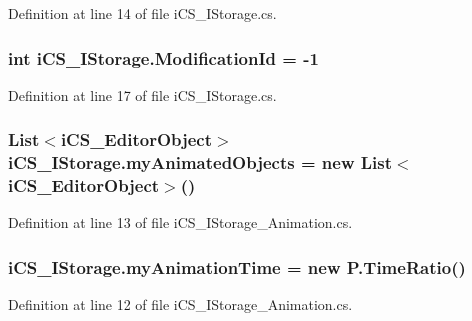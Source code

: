 Definition at line 14 of file i\+C\+S\+\_\+\+I\+Storage.\+cs.

\hypertarget{classi_c_s___i_storage_a0d048a5de0183c183b636c0bb5c8dddf}{
\subsubsection[{Modification\+Id}]{\setlength{\rightskip}{0pt plus 5cm}int i\+C\+S\+\_\+\+I\+Storage.\+Modification\+Id = -\/1}}\label{classi_c_s___i_storage_a0d048a5de0183c183b636c0bb5c8dddf}


Definition at line 17 of file i\+C\+S\+\_\+\+I\+Storage.\+cs.

\hypertarget{classi_c_s___i_storage_a1e7f74c1d51883bfc451ac154a7e468c}{
\subsubsection[{my\+Animated\+Objects}]{\setlength{\rightskip}{0pt plus 5cm}List$<${\bf i\+C\+S\+\_\+\+Editor\+Object}$>$ i\+C\+S\+\_\+\+I\+Storage.\+my\+Animated\+Objects = new List$<${\bf i\+C\+S\+\_\+\+Editor\+Object}$>$()}}\label{classi_c_s___i_storage_a1e7f74c1d51883bfc451ac154a7e468c}


Definition at line 13 of file i\+C\+S\+\_\+\+I\+Storage\+\_\+\+Animation.\+cs.

\hypertarget{classi_c_s___i_storage_a0c36a19bc9bbd91e7ed2d65c93546428}{
\subsubsection[{my\+Animation\+Time}]{ i\+C\+S\+\_\+\+I\+Storage.\+my\+Animation\+Time = new {\bf P.\+Time\+Ratio}()}}\label{classi_c_s___i_storage_a0c36a19bc9bbd91e7ed2d65c93546428}


Definition at line 12 of file i\+C\+S\+\_\+\+I\+Storage\+\_\+\+Animation.\+cs.

